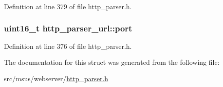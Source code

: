 Definition at line 379 of file http\-\_\-parser.\-h.

\hypertarget{structhttp__parser__url_a875fb8faf3ee45707078eda5435fa563}{
\subsubsection[{port}]{\setlength{\rightskip}{0pt plus 5cm}uint16\-\_\-t http\-\_\-parser\-\_\-url\-::port}}\label{structhttp__parser__url_a875fb8faf3ee45707078eda5435fa563}


Definition at line 376 of file http\-\_\-parser.\-h.



The documentation for this struct was generated from the following file\-:\begin{DoxyCompactItemize}
\item 
src/msus/webserver/\hyperlink{http__parser_8h}{http\-\_\-parser.\-h}\end{DoxyCompactItemize}
